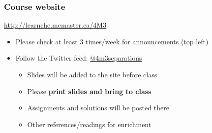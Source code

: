 \begin{frame}\frametitle{Course website}

	\begin{exampleblock}{}
		\centering
		\href{http://learnche.mcmaster.ca/4M3}{http://learnche.mcmaster.ca/4M3}
	\end{exampleblock}
	\begin{itemize}
		\item	Please check at least 3 times/week for announcements {\tiny (top left)}
		\item	Follow the Twitter feed: \href{https://twitter.com/4m3separations}{@4m3separations}
		
		\vspace{12pt}
		\begin{itemize}
			\item	Slides will be added to the site before class
			\item	Please \textbf{print slides and bring to class}
			\item	Assignments and solutions will be posted there
			\item	Other references/readings for enrichment
		\end{itemize}
	\end{itemize}
\end{frame}

